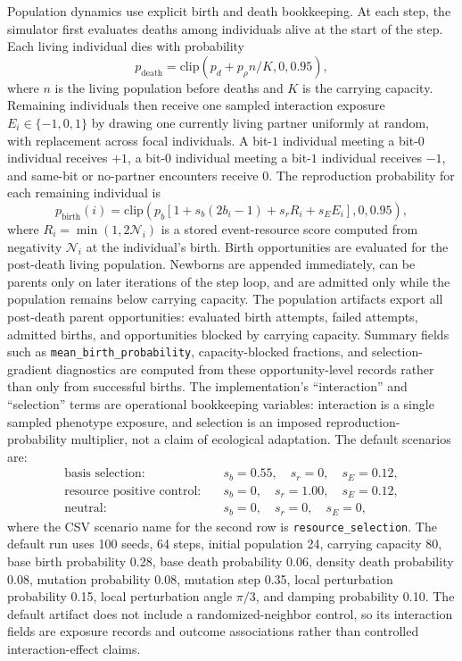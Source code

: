 \documentclass[11pt]{article}
\begin{document}
Population dynamics use explicit birth and death bookkeeping. At each step, the simulator first evaluates deaths among individuals alive at the start of the step. Each living individual dies with probability
\begin{equation}
p_{\mathrm{death}}=\mathrm{clip}(p_d+p_{\rho}n/K,0,0.95),
\end{equation}
where $n$ is the living population before deaths and $K$ is the carrying capacity. Remaining individuals then receive one sampled interaction exposure $E_i\in\{-1,0,1\}$ by drawing one currently living partner uniformly at random, with replacement across focal individuals. A bit-$1$ individual meeting a bit-$0$ individual receives $+1$, a bit-$0$ individual meeting a bit-$1$ individual receives $-1$, and same-bit or no-partner encounters receive $0$. The reproduction probability for each remaining individual is
\begin{equation}
p_{\mathrm{birth}}(i)=\mathrm{clip}\left(p_b\left[1+s_b(2b_i-1)+s_r R_i+s_E E_i\right],0,0.95\right),
\end{equation}
where $R_i=\min(1,2\mathcal{N}_i)$ is a stored event-resource score computed from negativity $\mathcal{N}_i$ at the individual's birth. Birth opportunities are evaluated for the post-death living population. Newborns are appended immediately, can be parents only on later iterations of the step loop, and are admitted only while the population remains below carrying capacity. The population artifacts export all post-death parent opportunities: evaluated birth attempts, failed attempts, admitted births, and opportunities blocked by carrying capacity. Summary fields such as \texttt{mean\_birth\_probability}, capacity-blocked fractions, and selection-gradient diagnostics are computed from these opportunity-level records rather than only from successful births. The implementation's ``interaction'' and ``selection'' terms are operational bookkeeping variables: interaction is a single sampled phenotype exposure, and selection is an imposed reproduction-probability multiplier, not a claim of ecological adaptation. The default scenarios are:
\begin{align}
\text{basis selection}:&\quad s_b=0.55,\quad s_r=0,\quad s_E=0.12,\\
\text{resource positive control}:&\quad s_b=0,\quad s_r=1.00,\quad s_E=0.12,\\
\text{neutral}:&\quad s_b=0,\quad s_r=0,\quad s_E=0,
\end{align}
where the CSV scenario name for the second row is \texttt{resource\_selection}. The default run uses 100 seeds, 64 steps, initial population 24, carrying capacity 80, base birth probability 0.28, base death probability 0.06, density death probability 0.08, mutation probability 0.08, mutation step 0.35, local perturbation probability 0.15, local perturbation angle $\pi/3$, and damping probability 0.10. The default artifact does not include a randomized-neighbor control, so its interaction fields are exposure records and outcome associations rather than controlled interaction-effect claims.
\end{document}
